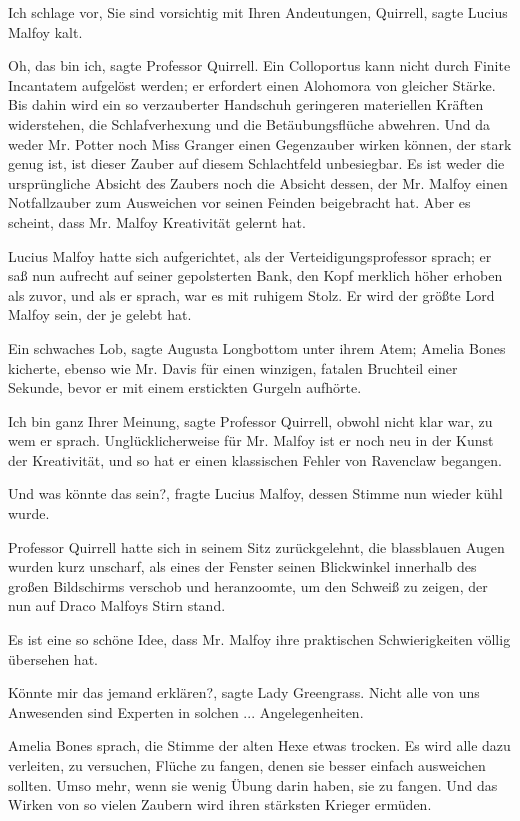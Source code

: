 \glqq Ich schlage vor, Sie sind vorsichtig mit Ihren Andeutungen,
Quirrell\grqq{}, sagte Lucius Malfoy kalt.

\glqq Oh, das bin ich\grqq{}, sagte Professor Quirrell. \glqq Ein Colloportus
kann nicht durch Finite Incantatem aufgelöst werden; er erfordert einen
Alohomora von gleicher Stärke. Bis dahin wird ein so verzauberter Handschuh
geringeren materiellen Kräften widerstehen, die Schlafverhexung und die
Betäubungsflüche abwehren. Und da weder Mr. Potter noch Miss Granger einen
Gegenzauber wirken können, der stark genug ist, ist dieser Zauber auf diesem
Schlachtfeld unbesiegbar. Es ist weder die ursprüngliche Absicht des Zaubers
noch die Absicht dessen, der Mr. Malfoy einen Notfallzauber zum Ausweichen vor
seinen Feinden beigebracht hat. Aber es scheint, dass Mr. Malfoy Kreativität
gelernt hat.\grqq{}

Lucius Malfoy hatte sich aufgerichtet, als der Verteidigungsprofessor sprach; er
saß nun aufrecht auf seiner gepolsterten Bank, den Kopf merklich höher erhoben
als zuvor, und als er sprach, war es mit ruhigem Stolz. \glqq Er wird der größte
Lord Malfoy sein, der je gelebt hat.\grqq{}

\glqq Ein schwaches Lob\grqq{}, sagte Augusta Longbottom unter ihrem Atem;
Amelia Bones kicherte, ebenso wie Mr. Davis für einen winzigen, fatalen
Bruchteil einer Sekunde, bevor er mit einem erstickten Gurgeln aufhörte.

\glqq Ich bin ganz Ihrer Meinung\grqq{}, sagte Professor Quirrell, obwohl nicht
klar war, zu wem er sprach. \glqq Unglücklicherweise für Mr. Malfoy ist er noch
neu in der Kunst der Kreativität, und so hat er einen klassischen Fehler von
Ravenclaw begangen.\grqq{}

\glqq Und was könnte das sein?\grqq{}, fragte Lucius Malfoy, dessen Stimme nun
wieder kühl wurde.

Professor Quirrell hatte sich in seinem Sitz zurückgelehnt, die blassblauen
Augen wurden kurz unscharf, als eines der Fenster seinen Blickwinkel innerhalb
des großen Bildschirms verschob und heranzoomte, um den Schweiß zu zeigen, der
nun auf Draco Malfoys Stirn stand.

\glqq Es ist eine so schöne Idee, dass Mr. Malfoy ihre praktischen
Schwierigkeiten völlig übersehen hat.\grqq{}

\glqq Könnte mir das jemand erklären?\grqq{}, sagte Lady Greengrass. \glqq Nicht
alle von uns Anwesenden sind Experten in solchen ... Angelegenheiten.\grqq{}

Amelia Bones sprach, die Stimme der alten Hexe etwas trocken. \glqq Es wird alle
dazu verleiten, zu versuchen, Flüche zu fangen, denen sie besser einfach
ausweichen sollten. Umso mehr, wenn sie wenig Übung darin haben, sie zu fangen.
Und das Wirken von so vielen Zaubern wird ihren stärksten Krieger
ermüden.\grqq{}

